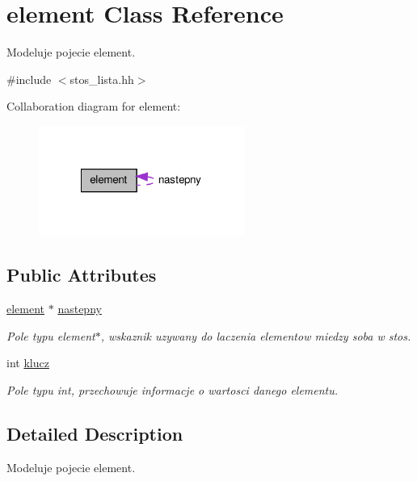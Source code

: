 \hypertarget{classelement}{\section{element Class Reference}
\label{classelement}
}


Modeluje pojecie element.  




{\ttfamily \#include $<$stos\-\_\-lista.\-hh$>$}



Collaboration diagram for element\-:\nopagebreak
\begin{figure}[H]
\begin{center}
\leavevmode
\includegraphics[width=191pt]{classelement__coll__graph}
\end{center}
\end{figure}
\subsection*{Public Attributes}
\begin{DoxyCompactItemize}
\item 
\hyperlink{classelement}{element} $\ast$ \hyperlink{classelement_ab6df52b0e5cfa7c4998a2ab74a8ef53e}{nastepny}
\begin{DoxyCompactList}\small\item\em Pole typu element$\ast$, wskaznik uzywany do laczenia elementow miedzy soba w stos. \end{DoxyCompactList}\item 
int \hyperlink{classelement_a112279ccab2f4e22485125be5bda7b75}{klucz}
\begin{DoxyCompactList}\small\item\em Pole typu int, przechowuje informacje o wartosci danego elementu. \end{DoxyCompactList}\end{DoxyCompactItemize}


\subsection{Detailed Description}
Modeluje pojecie element. 

